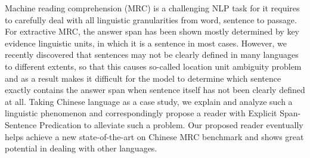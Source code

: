 Machine reading comprehension (MRC) is a challenging NLP task for it requires to carefully deal with all linguistic granularities from word, sentence to passage. For extractive MRC, the answer span has been shown mostly determined by key evidence linguistic units, in which it is a sentence in most cases. However, we recently discovered that sentences may not be clearly defined in many languages to different extents, so that this causes so-called location unit ambiguity problem and as a result makes it difficult for the model to determine which sentence exactly contains the answer span when sentence itself has not been clearly defined at all. Taking Chinese language as a case study, we explain and analyze such a linguistic phenomenon and correspondingly propose a reader with Explicit Span-Sentence Predication to alleviate such a problem. Our proposed reader eventually helps achieve a new state-of-the-art on Chinese MRC benchmark and shows great potential in dealing with other languages.
